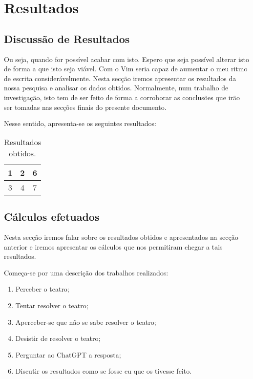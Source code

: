
\section{Resultados}\label{sec:resultados}

\subsection{Discussão de Resultados}\label{subsec:discussao}

Ou seja, quando for possível acabar com isto.
Espero que seja possível alterar isto de forma a que isto seja viável.
Com o Vim seria capaz de aumentar o meu ritmo de escrita considerávelmente.
Nesta secção iremos apresentar os resultados da nossa pesquisa e analisar os dados obtidos.
Normalmente, num trabalho de investigação, isto tem de ser feito de forma a corroborar as conclusões que irão ser tomadas nas secções finais do presente documento.

Nesse sentido, apresenta-se os seguintes resultados:

\begin{table}[htb!]
    \centering
    \caption{Resultados obtidos.}
    \label{tab:tabela1}
    \begin{tabular}{|c|c|c|}
        \hline
        1 & 2 & 6 \\ \hline
        3 & 4 & 7 \\ \hline
    \end{tabular}
\end{table}

\subsection{Cálculos efetuados}\label{subsec:calculos}

Nesta secção iremos falar sobre os resultados obtidos e apresentados na secção anterior e iremos apresentar os cálculos que nos permitiram chegar a tais resultados.

Começa-se por uma descrição dos trabalhos realizados:
\begin{enumerate}
    \item Perceber o teatro;
    \item Tentar resolver o teatro;
    \item Aperceber-se que não se sabe resolver o teatro;
    \item Desistir de resolver o teatro;
    \item Perguntar ao ChatGPT a resposta;
    \item Discutir os resultados como se fosse eu que os tivesse feito.
\end{enumerate}
